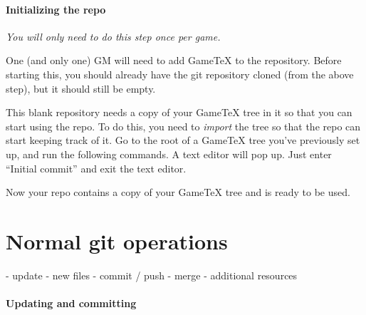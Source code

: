 \documentclass[green]{testgame}
\begin{document}
\paragraph{Initializing the repo} \emph{You will only need to do this step once per game.}

One (and only one) GM will need to add GameTeX to the repository. Before starting this, you should already have the git repository cloned (from the above step), but it should still be empty.


This blank repository needs a copy of your GameTeX tree in it so that
you can start using the repo. To do this, you need to \emph{import} the
tree so that the repo can start keeping track of it. Go to the root of
a GameTeX tree you've previously set up, and run the following
commands. A text editor will pop up. Just enter ``Initial commit'' and
exit the text editor.


Now your repo contains a copy of your GameTeX tree and is ready to be
used.

\section{Normal git operations}
\label{sec:normal}

- update
- new files
- commit / push
- merge
- additional resources

\paragraph*{Updating and committing}
\end{document}
